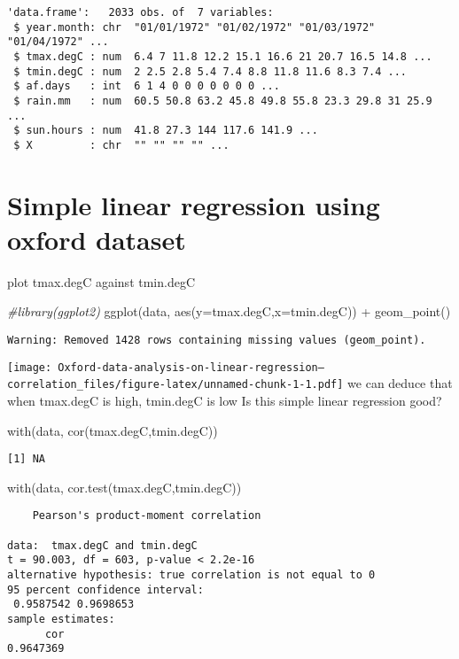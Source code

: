 \documentclass[
]{article}
\newenvironment{Shaded}{\begin{snugshade}}{\end{snugshade}}
\newcommand{\AttributeTok}[1]{\textcolor[rgb]{0.77,0.63,0.00}{#1}}
\newcommand{\CommentTok}[1]{\textcolor[rgb]{0.56,0.35,0.01}{\textit{#1}}}
\newcommand{\FunctionTok}[1]{\textcolor[rgb]{0.00,0.00,0.00}{#1}}
\newcommand{\NormalTok}[1]{#1}
\newcommand{\SpecialCharTok}[1]{\textcolor[rgb]{0.00,0.00,0.00}{#1}}
\begin{document}
\begin{verbatim}
'data.frame':   2033 obs. of  7 variables:
 $ year.month: chr  "01/01/1972" "01/02/1972" "01/03/1972" "01/04/1972" ...
 $ tmax.degC : num  6.4 7 11.8 12.2 15.1 16.6 21 20.7 16.5 14.8 ...
 $ tmin.degC : num  2 2.5 2.8 5.4 7.4 8.8 11.8 11.6 8.3 7.4 ...
 $ af.days   : int  6 1 4 0 0 0 0 0 0 0 ...
 $ rain.mm   : num  60.5 50.8 63.2 45.8 49.8 55.8 23.3 29.8 31 25.9 ...
 $ sun.hours : num  41.8 27.3 144 117.6 141.9 ...
 $ X         : chr  "" "" "" "" ...
\end{verbatim}

\hypertarget{simple-linear-regression-using-oxford-dataset}{%
\section{Simple linear regression using oxford
dataset}\label{simple-linear-regression-using-oxford-dataset}}

plot tmax.degC against tmin.degC

\begin{Shaded}
\begin{Highlighting}[]
\CommentTok{\#library(ggplot2)}
\FunctionTok{ggplot}\NormalTok{(data, }\FunctionTok{aes}\NormalTok{(}\AttributeTok{y=}\NormalTok{tmax.degC,}\AttributeTok{x=}\NormalTok{tmin.degC)) }\SpecialCharTok{+}
  \FunctionTok{geom\_point}\NormalTok{()}
\end{Highlighting}
\end{Shaded}

\begin{verbatim}
Warning: Removed 1428 rows containing missing values (geom_point).
\end{verbatim}

\texttt{[image: Oxford-data-analysis-on-linear-regression---correlation\_files/figure-latex/unnamed-chunk-1-1.pdf]}
we can deduce that when tmax.degC is high, tmin.degC is low Is this
simple linear regression good?

\begin{Shaded}
\begin{Highlighting}[]
\FunctionTok{with}\NormalTok{(data, }\FunctionTok{cor}\NormalTok{(tmax.degC,tmin.degC))}
\end{Highlighting}
\end{Shaded}

\begin{verbatim}
[1] NA
\end{verbatim}

\begin{Shaded}
\begin{Highlighting}[]
\FunctionTok{with}\NormalTok{(data, }\FunctionTok{cor.test}\NormalTok{(tmax.degC,tmin.degC))}
\end{Highlighting}
\end{Shaded}

\begin{verbatim}
    Pearson's product-moment correlation

data:  tmax.degC and tmin.degC
t = 90.003, df = 603, p-value < 2.2e-16
alternative hypothesis: true correlation is not equal to 0
95 percent confidence interval:
 0.9587542 0.9698653
sample estimates:
      cor 
0.9647369 
\end{verbatim}
\end{document}
